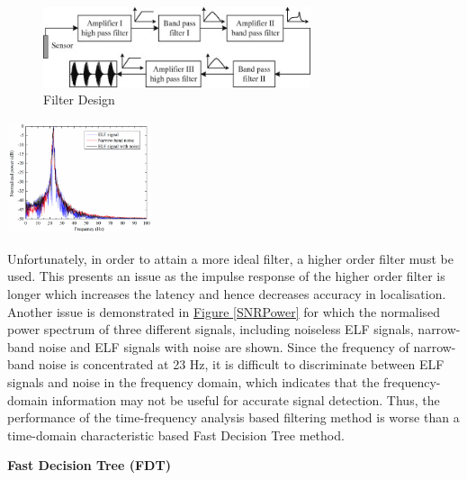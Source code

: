 \documentclass[11pt]{article}		%
\newcommand{\figref}[1]{\hyperref[#1]{Figure \ref*{#1}}}    %
\begin{document}
	        \begin{figure}[h]
				\centering
				\includegraphics[width = 0.7\textwidth]{Filtering.jpg}
				\caption{Filter Design} %
				\label{filterDesign}
			\end{figure}
			
			\begin{floatingfigure}[r]{0.35\textwidth}
				\centering
				\includegraphics[width=0.32\textwidth]{SNRPower}
				\caption{Normalised power spectrum when SNR is 0 dB and speed is 15 m/s}
				\label{SNRPower}
			\end{floatingfigure}
			Unfortunately, in order to attain a more ideal filter, a higher order filter must be used.
			This presents an issue as the impulse response of the higher order filter is longer which increases the latency and hence decreases accuracy in localisation. 
			Another issue is demonstrated in \figref{SNRPower} for which the normalised power spectrum of three different signals, including noiseless ELF signals, narrow-band noise and ELF signals with noise are shown. 
			Since the frequency of narrow-band noise is concentrated at 23 Hz, it is difficult to discriminate between ELF signals and noise in the frequency domain, which indicates that the frequency-domain information may not be useful for accurate signal detection. 
			Thus, the performance of the time-frequency analysis based filtering method is worse than a time-domain characteristic based Fast Decision Tree method.
	
		    \textbf{Fast Decision Tree (FDT)}
		    
		    \begin{floatingfigure}[r]{0pt} \end{floatingfigure}
		    
\end{document}
